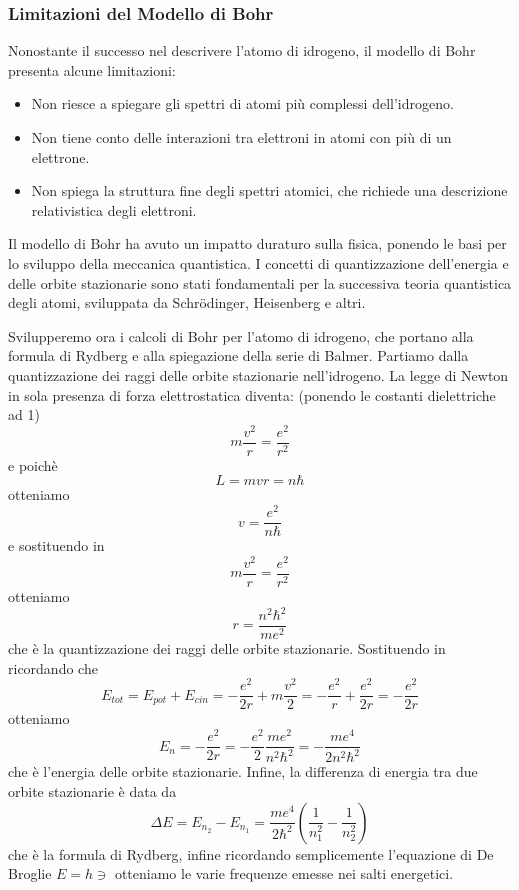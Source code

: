 \subsubsection*{Limitazioni del Modello di Bohr}
Nonostante il successo nel descrivere l'atomo di idrogeno, il modello di Bohr presenta alcune limitazioni:
\begin{itemize}
    \item Non riesce a spiegare gli spettri di atomi più complessi dell'idrogeno.
    \item Non tiene conto delle interazioni tra elettroni in atomi con più di un elettrone.
    \item Non spiega la struttura fine degli spettri atomici, che richiede una descrizione relativistica degli elettroni.
\end{itemize}
Il modello di Bohr ha avuto un impatto duraturo sulla fisica, ponendo le basi per lo sviluppo della meccanica quantistica. I concetti di quantizzazione dell'energia e delle orbite stazionarie sono stati fondamentali per la successiva teoria quantistica degli atomi, sviluppata da Schrödinger, Heisenberg e altri.

Svilupperemo ora i calcoli di Bohr per l'atomo di idrogeno, che portano alla formula di Rydberg e alla spiegazione della serie di Balmer. Partiamo dalla quantizzazione dei raggi delle orbite stazionarie nell'idrogeno. La legge di Newton in sola presenza di forza elettrostatica diventa: (ponendo le costanti dielettriche ad 1) 
$$m\frac{v^2}{r} = \frac{e^2}{r^2}$$e poichè $$L = mvr = n\hbar$$ otteniamo $$v = \frac{e^2}{n\hbar}$$ e sostituendo in $$m\frac{v^2}{r} = \frac{e^2}{r^2}$$ otteniamo $$r = \frac{n^2\hbar^2}{me^2}$$ che è la quantizzazione dei raggi delle orbite stazionarie. Sostituendo in ricordando che $$E_{tot}= E_{pot} + E_{cin} = -\frac{e^2}{2r} +  m \dfrac{v^2}{2} = -\frac{e^2}{r} + \frac{e^2}{2r} = -\frac{e^2}{2r}$$ otteniamo $$E_n = -\frac{e^2}{2r} = -\frac{e^2}{2} \frac{me^2}{n^2\hbar^2} = -\frac{me^4}{2n^2\hbar^2}$$ che è l'energia delle orbite stazionarie. Infine, la differenza di energia tra due orbite stazionarie è data da $$\Delta E = E_{n_2} - E_{n_1} = \frac{me^4}{2\hbar^2} \left( \frac{1}{n_1^2} - \frac{1}{n_2^2} \right)$$ che è la formula di Rydberg, infine ricordando semplicemente l'equazione di De Broglie $E = h \ni$ otteniamo le varie frequenze emesse nei salti energetici. 